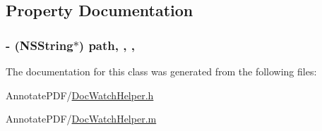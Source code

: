 \subsection{Property Documentation}
\hypertarget{interface_doc_watch_helper_a3bcb67415de88a91a9a0b284dbdbacc8}{
\subsubsection[{path}]{\setlength{\rightskip}{0pt plus 5cm}-\/ (N\-S\-String$\ast$) path\hspace{0.3cm}{\ttfamily [read]}, {\ttfamily [write]}, {\ttfamily [atomic]}, {\ttfamily [strong]}}}\label{interface_doc_watch_helper_a3bcb67415de88a91a9a0b284dbdbacc8}


The documentation for this class was generated from the following files\-:\begin{DoxyCompactItemize}
\item 
Annotate\-P\-D\-F/\hyperlink{_doc_watch_helper_8h}{Doc\-Watch\-Helper.\-h}\item 
Annotate\-P\-D\-F/\hyperlink{_doc_watch_helper_8m}{Doc\-Watch\-Helper.\-m}\end{DoxyCompactItemize}

